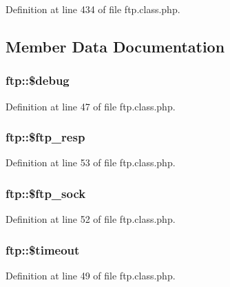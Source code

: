 Definition at line 434 of file ftp.\-class.\-php.



\subsection{Member Data Documentation}
\hypertarget{classftp_a757e4db04d53816db79f117809ffbad2}{
\subsubsection[{\$debug}]{\setlength{\rightskip}{0pt plus 5cm}ftp\-::\$debug}}\label{classftp_a757e4db04d53816db79f117809ffbad2}


Definition at line 47 of file ftp.\-class.\-php.

\hypertarget{classftp_a2bc470fe4d815181c723061b1d2ad824}{
\subsubsection[{\$ftp\-\_\-resp}]{\setlength{\rightskip}{0pt plus 5cm}ftp\-::\$ftp\-\_\-resp}}\label{classftp_a2bc470fe4d815181c723061b1d2ad824}


Definition at line 53 of file ftp.\-class.\-php.

\hypertarget{classftp_a3beffe299e11edfce6ffe4608c2f5dc8}{
\subsubsection[{\$ftp\-\_\-sock}]{\setlength{\rightskip}{0pt plus 5cm}ftp\-::\$ftp\-\_\-sock}}\label{classftp_a3beffe299e11edfce6ffe4608c2f5dc8}


Definition at line 52 of file ftp.\-class.\-php.

\hypertarget{classftp_a219848d21bf555048933e205c270b530}{
\subsubsection[{\$timeout}]{\setlength{\rightskip}{0pt plus 5cm}ftp\-::\$timeout}}\label{classftp_a219848d21bf555048933e205c270b530}


Definition at line 49 of file ftp.\-class.\-php.

